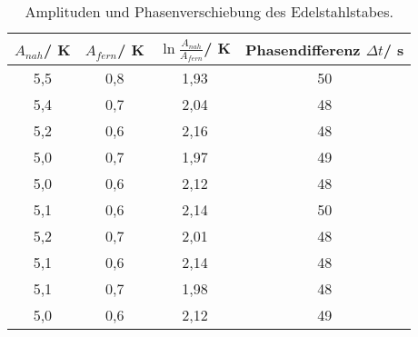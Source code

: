 \begin{table}[H]
  \centering
   \begin{tabular}{c c c c}
    \toprule
     $A_{nah}$/ K & $A_{fern}$/ K & $\ln{\frac{A_{nah}}{A_{fern}}}$/ K & Phasendifferenz $\Delta t$/ s\\
    \midrule
    5,5 & 0,8 & 1,93 & 50 \\
    5,4 & 0,7 & 2,04 & 48 \\
    5,2 & 0,6 & 2,16 & 48 \\
    5,0 & 0,7 & 1,97 & 49 \\
    5,0 & 0,6 & 2,12 & 48 \\
    5,1 & 0,6 & 2,14 & 50 \\
    5,2 & 0,7 & 2,01 & 48 \\
    5,1 & 0,6 & 2,14 & 48 \\
    5,1 & 0,7 & 1,98 & 48 \\
    5,0 & 0,6 & 2,12 & 49\\
    \bottomrule
  \end{tabular}
  \caption{Amplituden und Phasenverschiebung des Edelstahlstabes.}
  \label{tab:tab4}
\end{table}
